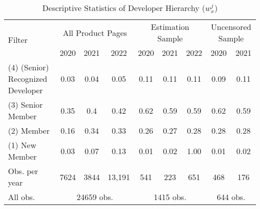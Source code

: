 \documentclass[13pt]{article}
\numberwithin{figure}{section}
\numberwithin{table}{section}
\theoremstyle{indented}
\numberwithin{equation}{section} %
\begin{document}
 
 
 
 
 
 
 
 
 
 
 
 
 
 
 
 
 
 
 
 
 
 
 
 
 
 
 
 
 
    \begin{table}
    \centering
       \caption{Descriptive Statistics of Developer Hierarchy ($w_x^j$)} 
  \label{table:title_decomp} 
  \begin{tabular}{|l|c|c|c|c|c|c|c|c|}
        \hline 
    \multirow{2}{*}{Filter}  & \multicolumn{3}{c|}{All Product Pages} & \multicolumn{3}{c|}{Estimation Sample}&\multicolumn{2}{c|}{Uncensored Sample} \\ 
        \cline{2-9} 
       & 2020 & 2021 & 2022 &2020&2021&2022&2020&2021\\ 
         \hline

    (4) (Senior) Recognized Developer   & 0.03 & 0.04 & 0.05 & 0.11 & 0.11 & 0.11 & 0.09 & 0.11\\ 
    
    (3) Senior Member & 0.35 & 0.4 & 0.42 & 0.62 & 0.59 & 0.59 & 0.62 & 0.59 \\ 
    
    (2) Member  & 0.16 & 0.34 & 0.33 & 0.26 & 0.27 & 0.28 & 0.28 & 0.28\\ 
    
    (1) New Member  & 0.03 & 0.07 & 0.13 & 0.01 & 0.02 & 1.00 & 0.01 & 0.02\\ 
    \hline
 
    Obs. per year   &  7624& 3844&  13,191& 541 & 223 & 651 & 468 & 176 \\
        \hline 
    All obs.& \multicolumn{3}{c|}{ 24659 obs.} & \multicolumn{3}{c|}{1415 obs.}&\multicolumn{2}{c|}{644 obs.} \\
    \hline
    \end{tabular} 
    \end{table} 
\end{document}
